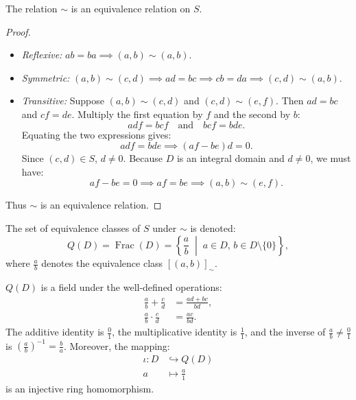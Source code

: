 \begin{lemma}
\label{lem:frac_equiv}
The relation $\sim$ is an equivalence relation on $S$.
\end{lemma}

\begin{proof}
\begin{itemize}[leftmargin=1.5em, itemsep=4pt]
    \item \emph{Reflexive:} $ab = ba \implies (a, b) \sim (a, b)$.
    \item \emph{Symmetric:} $(a, b) \sim (c, d) \implies ad = bc \implies cb = da \implies (c, d) \sim (a, b)$.
    \item \emph{Transitive:} Suppose $(a, b) \sim (c, d)$ and $(c, d) \sim (e, f)$.
    Then $ad = bc$ and $cf = de$.
    Multiply the first equation by $f$ and the second by $b$:
    \begin{equation*}
    adf = bcf \quad \text{and} \quad bcf = bde.
    \end{equation*}
    Equating the two expressions gives:
    \begin{equation*}
    adf = bde \implies (af - be)d = 0.
    \end{equation*}
    Since $(c, d) \in S$, $d \ne 0$.
    Because $D$ is an integral domain and $d \ne 0$, we must have:
    \begin{equation*}
    af - be = 0 \implies af = be \implies (a, b) \sim (e, f).
    \end{equation*}
\end{itemize}
Thus $\sim$ is an equivalence relation.
\end{proof}

\begin{definition}
The set of equivalence classes of $S$ under $\sim$ is denoted:
\begin{equation}
Q(D) = \operatorname{Frac}(D) = \left\{ \frac{a}{b} \;\middle|\; a \in D, \, b \in D \setminus \{0\} \right\},
\end{equation}
where $\frac{a}{b}$ denotes the equivalence class $[(a, b)]_\sim$.
\end{definition}

\begin{theorem}
\label{thm:field_of_fractions}
$Q(D)$ is a field under the well-defined operations:
\begin{align}
\frac{a}{b} + \frac{c}{d} &= \frac{ad + bc}{bd}, \\
\frac{a}{b} \cdot \frac{c}{d} &= \frac{ac}{bd}.
\end{align}
The additive identity is $\frac{0}{1}$, the multiplicative identity is $\frac{1}{1}$, and the inverse of $\frac{a}{b} \ne \frac{0}{1}$ is $\left(\frac{a}{b}\right)^{-1} = \frac{b}{a}$.
Moreover, the mapping:
\begin{align}
\iota: D &\hookrightarrow Q(D) \\
a &\longmapsto \frac{a}{1}
\end{align}
is an injective ring homomorphism.
\end{theorem}

